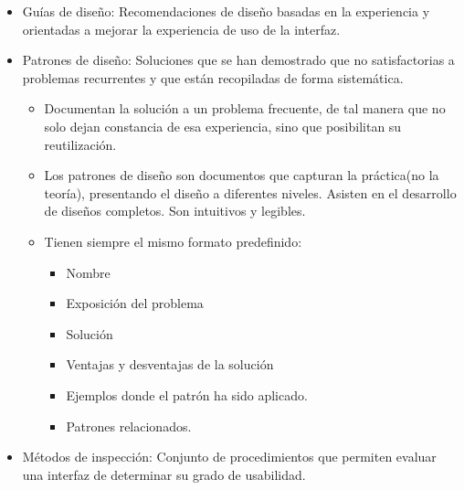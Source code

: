 \documentclass[12pt, twoside, openright]{report} %
\begin{document}
\begin{itemize}
\begin{itemize}
		      \item Guías de diseño: Recomendaciones de diseño basadas en la
		            experiencia y orientadas a mejorar la experiencia de uso de la
		            interfaz.
		            \pagebreak

		      \item Patrones de diseño: Soluciones que se han demostrado que no
		            satisfactorias a problemas recurrentes y que están recopiladas de
		            forma sistemática.

		            \begin{itemize}
			            \item Documentan la solución a un problema frecuente, de tal manera
			                  que no solo dejan constancia de esa experiencia, sino que
			                  posibilitan su reutilización.

			            \item Los patrones de diseño son documentos que capturan la
			                  práctica(no la teoría), presentando el diseño a diferentes
			                  niveles. Asisten en el desarrollo de diseños completos. Son
			                  intuitivos y legibles.

			            \item Tienen siempre el mismo formato predefinido:

			                  \begin{itemize}
				                  \item Nombre

				                  \item Exposición del problema

				                  \item Solución

				                  \item Ventajas y desventajas de la solución

				                  \item Ejemplos donde el patrón ha sido aplicado.

				                  \item Patrones relacionados.
			                  \end{itemize}
		            \end{itemize}

		      \item Métodos de inspección: Conjunto de procedimientos que permiten
		            evaluar una interfaz de determinar su grado de usabilidad.
	      \end{itemize}
\end{itemize}
\pagebreak
\end{document}
